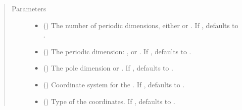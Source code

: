 \documentclass[letterpaper,10pt,english]{sphinxmanual}
\begin{document}
\begin{fulllineitems}
\begin{quote}
\begin{description}
\end{description}\end{quote}

\begin{quote}\begin{description}
\item[{Parameters}] \leavevmode\begin{itemize}
\item {} 
 () \textendash{} The number of periodic dimensions, either 
or . If , defaults to .

\item {} 
 () \textendash{} The periodic dimension: ,  or .
If , defaults to .

\item {} 
 () \textendash{} The pole dimension  or .
If , defaults to .

\item {} 
 ({\hyperref[\detokenize{CoordSys:ESMF.api.constants.CoordSys}]{}}) \textendash{} Coordinate system for the
{\hyperref[\detokenize{grid:ESMF.api.grid.Grid}]{}}.
If , defaults to {\hyperref[\detokenize{CoordSys:ESMF.api.constants.CoordSys.SPH_DEG}]{}}.

\item {} 
 ({\hyperref[\detokenize{TypeKind:ESMF.api.constants.TypeKind}]{}}) \textendash{} Type of the {\hyperref[\detokenize{grid:ESMF.api.grid.Grid}]{}}
coordinates.
If , defaults to {\hyperref[\detokenize{TypeKind:ESMF.api.constants.TypeKind.R8}]{}}.


\end{itemize}
\end{description}
\end{quote}
\end{fulllineitems}
\end{document}
